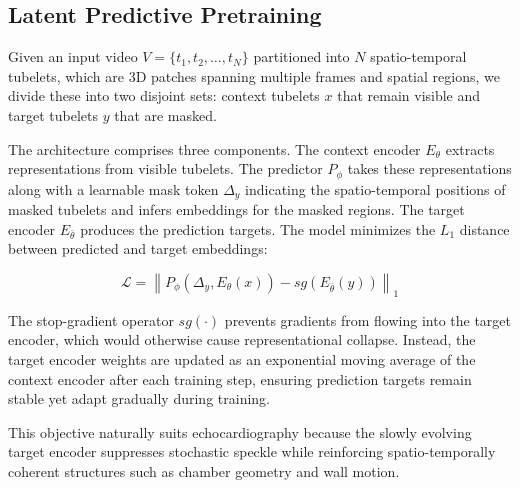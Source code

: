 \documentclass{article}
\theoremstyle{plain}
\theoremstyle{definition}
\theoremstyle{remark}
\begin{document}
\subsection{Latent Predictive Pretraining}
\label{sec:method:jepa}

Given an input video $V = \{t_1, t_2, \ldots, t_N\}$ partitioned into $N$ spatio-temporal tubelets, which are 3D patches spanning multiple frames and spatial regions, we divide these into two disjoint sets: context tubelets $x$ that remain visible and target tubelets $y$ that are masked.

The architecture comprises three components. The context encoder $E_\theta$ extracts representations from visible tubelets. The predictor $P_\phi$ takes these representations along with a learnable mask token $\Delta_y$ indicating the spatio-temporal positions of masked tubelets and infers embeddings for the masked regions. The target encoder $E_{\bar{\theta}}$ produces the prediction targets. The model minimizes the $L_1$ distance between predicted and target embeddings:


\begin{equation}
    \mathcal{L} = \left\| P_\phi(\Delta_y, E_\theta(x)) - sg(E_{\bar{\theta}}(y)) \right\|_1
    \label{eq:jepa_loss}
\end{equation}


The stop-gradient operator $sg(\cdot)$ prevents gradients from flowing into the target encoder, which would otherwise cause representational collapse. Instead, the target encoder weights are updated as an exponential moving average of the context encoder after each training step, ensuring prediction targets remain stable yet adapt gradually during training.

This objective naturally suits echocardiography because the slowly evolving target encoder suppresses stochastic speckle while reinforcing spatio-temporally coherent structures such as chamber geometry and wall motion.


\end{document}
